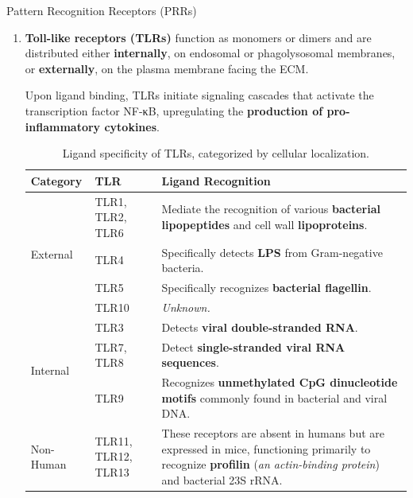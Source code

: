 \begin{core}[label=core:prr]{Pattern Recognition Receptors (PRRs)}
\begin{enumerate}
\begin{itemize}
            \item \ul{NOD proteins}: Intracellular sensors that detect degradation products of \textbf{bacterial cell walls} within the cytoplasm.

          \end{itemize}

        \item \textbf{Toll-like receptors (TLRs)} function as monomers or dimers and are distributed either \textbf{internally}, on endosomal or phagolysosomal membranes, or \textbf{externally}, on the plasma membrane facing the ECM.

          \vspace{-0.5cm}

          Upon ligand binding, TLRs initiate signaling cascades that activate the transcription factor NF-κB, upregulating the \textbf{production of pro-inflammatory cytokines}.

          \begin{table}[H]
            \centering
            \small
            \begin{tabular}{@{}l l p{9cm}@{}}
              \hline
              \textbf{Category} & \textbf{TLR} & \textbf{Ligand Recognition} \\
              \hline
              \multirow{4}{*}{External}
                & TLR1, TLR2, TLR6 & Mediate the recognition of various \textbf{bacterial lipopeptides} and cell wall \textbf{lipoproteins}. \\
                & TLR4 & Specifically detects \textbf{LPS} from Gram-negative bacteria. \\
                & TLR5 & Specifically recognizes \textbf{bacterial flagellin}. \\
                & TLR10 & \textit{Unknown.} \\
              \hline
              \multirow{3}{*}{Internal}
                & TLR3 & Detects \textbf{viral double-stranded RNA}. \\
                & TLR7, TLR8 & Detect \textbf{single-stranded viral RNA sequences}. \\
                & TLR9 & Recognizes \textbf{unmethylated CpG dinucleotide motifs} commonly found in bacterial and viral DNA. \\
              \hline
              Non-Human & TLR11, TLR12, TLR13 & These receptors are absent in humans but are expressed in mice, functioning primarily to recognize \textbf{profilin} (\textit{an actin-binding protein}) and bacterial 23S rRNA. \\
              \hline
            \end{tabular}
            \caption{Ligand specificity of TLRs, categorized by cellular localization.}
            \label{tab:tlr_ligand}
          \end{table}


\end{enumerate}
\end{core}
